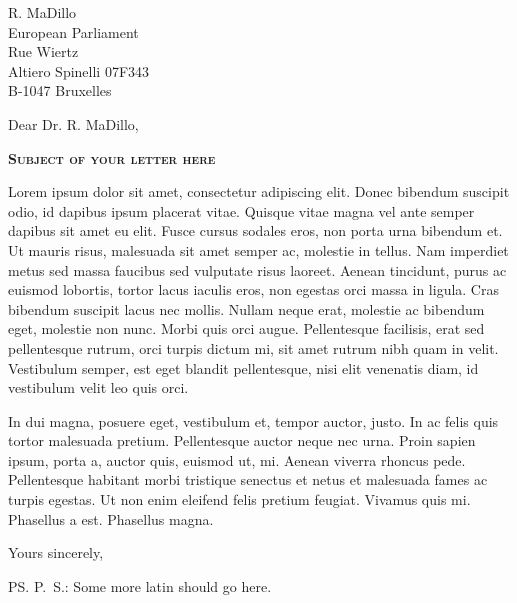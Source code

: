 \documentclass[a4paper,12pt]{letter}
\date{February 31, 2013}
\begin{document}
\begin{letter}{
    R. MaDillo\\
    European Parliament\\
    Rue Wiertz\\
    Altiero Spinelli 07F343\\
    B-1047 Bruxelles 
  }
  \opening{Dear Dr. R. MaDillo,}
{
  \begin{center}
    \textbf{\textsc{Subject of your letter here}}\\[2em]
  \end{center}
}
%
{
  \setlength{\parindent}{0.5cm}
  \setlength{\parskip}{0pt plus 0.1pt}

  Lorem ipsum dolor sit amet, consectetur adipiscing elit. Donec bibendum 
  suscipit odio, id dapibus ipsum placerat vitae. Quisque vitae magna vel ante 
  semper dapibus sit amet eu elit. Fusce cursus sodales eros, non porta urna 
  bibendum et. Ut mauris risus, malesuada sit amet semper ac, molestie in 
  tellus. Nam imperdiet metus sed massa faucibus sed vulputate risus laoreet. 
  Aenean tincidunt, purus ac euismod lobortis, tortor lacus iaculis eros, non 
  egestas orci massa in ligula. Cras bibendum suscipit lacus nec mollis. Nullam 
  neque erat, molestie ac bibendum eget, molestie non nunc. Morbi quis orci 
  augue. Pellentesque facilisis, erat sed pellentesque rutrum, orci turpis 
  dictum mi, sit amet rutrum nibh quam in velit. Vestibulum semper, est eget 
  blandit pellentesque, nisi elit venenatis diam, id vestibulum velit leo quis 
	orci. 
  
  In dui magna, posuere eget, vestibulum et, tempor auctor, justo. In ac felis 
  quis tortor malesuada pretium. Pellentesque auctor neque nec urna. Proin 
  sapien ipsum, porta a, auctor quis, euismod ut, mi. Aenean viverra rhoncus 
  pede. Pellentesque habitant morbi tristique senectus et netus et malesuada 
  fames ac turpis egestas. Ut non enim eleifend felis pretium feugiat. Vivamus 
  quis mi. Phasellus a est. Phasellus magna.
}

  \closing{Yours sincerely,}
%
  \ps{P.\ S.: Some more latin should go here.}

  \vspace{1cm}
  \begingroup
  \def\enotesize{\small}
  \def\enoteheading{\Large \textsc{Notes}}
  \theendnotes
  \endgroup
\end{letter}
\end{document}
